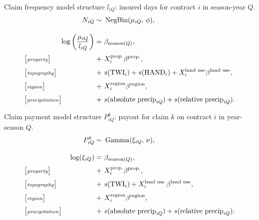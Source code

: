 \begin{frame}{Claim frequency model structure}
  $l_{iQ}$: insured days for contract $i$ in season-year $Q$.
  \centering
  \begin{align*}
    N_{iQ} \sim \ &\operatorname{NegBin}(\mu_{iQ},\, \phi), \\[0.3cm]
    \log\left(\frac{\mu_{iQ}}{l_{iQ}}\right)
    = \ &\beta_{\text{season}(Q)}, \\[0.10cm]
    \makebox[0.30\linewidth][l]{$\big[$\textit{\scriptsize property}$\big]$}
    +\ &X_i^{\text{prop.}}\beta^{\text{prop.}},
    \\[0.1cm]
    \makebox[0.30\linewidth][l]{$\big[$\textit{\scriptsize topography}$\big]$}
    +\ &s(\text{TWI}_i)
    + s(\text{HAND}_i)
    + X_i^{\text{land use}}\beta^{\text{land use}}, \\[0.1cm]
    \makebox[0.30\linewidth][l]{$\big[$\textit{\scriptsize region}$\big]$}
    +\ &X_i^{\text{region}}\beta^{\text{region}},
    \\[0.1cm]
    \makebox[0.30\linewidth][l]{$\big[$\textit{\scriptsize
    precipitation}$\big]$}
    +\ &s(\text{absolute precip}_{iQ})
    + s(\text{relative precip}_{iQ}).
  \end{align*}
\end{frame}

\begin{frame}{Claim payment model structure}
  $P_{iQ}^k$: payout for claim $k$ on contract $i$ in year-season $Q$.
  \centering
  \begin{align*}
    P_{iQ}^k \sim \ &\operatorname{Gamma}(\xi_{iQ},\, \nu), \\[0.3cm]
    \log(\xi_{iQ})
    = \ &\beta_{\text{season}(Q)}, \\[0.10cm]
    \makebox[0.30\linewidth][l]{$\big[$\textit{\scriptsize property}$\big]$}
    +\ &X_i^{\text{prop.}}\beta^{\text{prop.}},
    \\[0.1cm]
    \makebox[0.30\linewidth][l]{$\big[$\textit{\scriptsize topography}$\big]$}
    +\ &s(\text{TWI}_i)
    + X_i^{\text{land use}}\, \beta^{\text{land use}}, \\[0.1cm]
    \makebox[0.30\linewidth][l]{$\big[$\textit{\scriptsize region}$\big]$}
    +\ &X_i^{\text{region}}\beta^{\text{region}},
    \\[0.1cm]
    \makebox[0.30\linewidth][l]{$\big[$\textit{\scriptsize
    precipitation}$\big]$}
    +\ &s(\text{absolute precip}_{iQ})
    + s(\text{relative precip}_{iQ}).
  \end{align*}
\end{frame}

